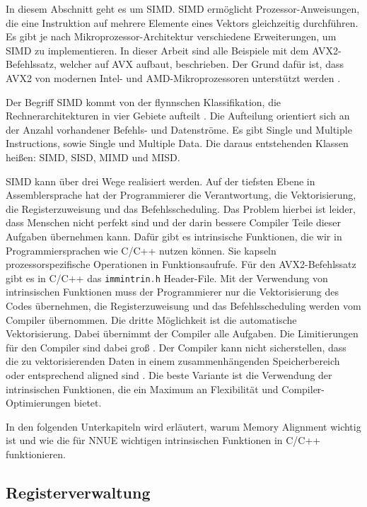 In diesem Abschnitt geht es um \ac{SIMD}. \ac{SIMD} ermöglicht Prozessor-Anweisungen, die eine Instruktion auf mehrere Elemente eines Vektors gleichzeitig durchführen. Es gibt je nach Mikroprozessor-Architektur verschiedene Erweiterungen, um \ac{SIMD} zu implementieren. In dieser Arbeit sind alle Beispiele mit dem \ac{AVX2}-Befehlssatz, welcher auf \ac{AVX} aufbaut, beschrieben. Der Grund dafür ist, dass \ac{AVX2} von modernen Intel- und AMD-Mikroprozessoren unterstützt werden \cite[S. 117]{fog2006optimizing}.

Der Begriff \ac{SIMD} kommt von der flynnschen Klassifikation, die Rechnerarchitekturen in vier Gebiete aufteilt \cite{Flynn1972}. Die Aufteilung orientiert sich an der Anzahl vorhandener Befehls- und Datenströme. Es gibt Single und Multiple Instructions, sowie Single und Multiple Data. Die daraus entstehenden Klassen heißen: \ac{SIMD}, \ac{SISD}, \ac{MIMD} und \ac{MISD}.

\ac{SIMD} kann über drei Wege realisiert werden. Auf der tiefsten Ebene in Assemblersprache hat der Programmierer die Verantwortung, die Vektorisierung, die Registerzuweisung und das Befehlsscheduling. Das Problem hierbei ist leider, dass Menschen nicht perfekt sind und der darin bessere Compiler Teile dieser Aufgaben übernehmen kann. Dafür gibt es intrinsische Funktionen, die wir in Programmiersprachen wie C/C++ nutzen können. Sie kapseln prozessorspezifische Operationen in Funktionsaufrufe. Für den \ac{AVX2}-Befehlssatz gibt es in C/C++ das \lstinline[language=C++]{immintrin.h} Header-File. Mit der Verwendung von intrinsischen Funktionen muss der Programmierer nur die Vektorisierung des Codes übernehmen, die Registerzuweisung und das Befehlsscheduling werden vom Compiler übernommen. Die dritte Möglichkeit ist die automatische Vektorisierung. Dabei übernimmt der Compiler alle Aufgaben. Die Limitierungen für den Compiler sind dabei groß \cite{ren2003preliminary}. Der Compiler kann nicht sicherstellen, dass die zu vektorisierenden Daten in einem zusammenhängenden Speicherbereich oder entsprechend aligned sind \cite[S. 118-120]{fog2006optimizing}. Die beste Variante ist die Verwendung der intrinsischen Funktionen, die ein Maximum an Flexibilität und Compiler-Optimierungen bietet.

In den folgenden Unterkapiteln wird erläutert, warum Memory Alignment wichtig ist und wie die für \ac{NNUE} wichtigen intrinsischen Funktionen in C/C++ funktionieren.

\subsection{Registerverwaltung}

